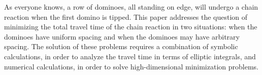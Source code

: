 %
%
%
%
%
%
As everyone knows, a row of dominoes, all standing on edge, will
undergo a chain reaction when the first domino is tipped. This
paper addresses the question of minimizing the total travel time
of the chain reaction in two situations: when the dominoes have
uniform spacing and when the dominoes may have arbitrary spacing.
The solution of these problems requires a combination of symbolic
calculations, in order to analyze the travel time in terms of
elliptic integrals, and numerical calculations, in order to solve
high-dimensional minimization problems.
